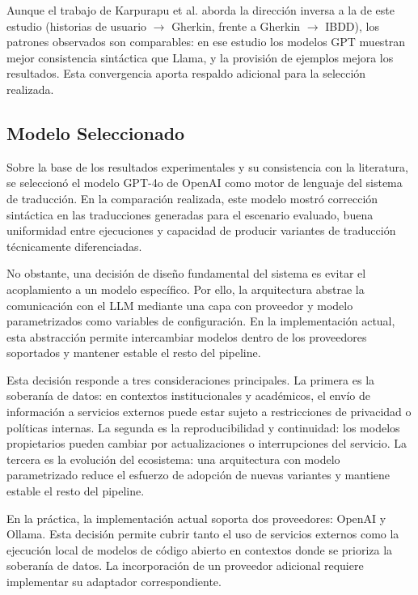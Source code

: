 Aunque el trabajo de Karpurapu et al. aborda la dirección inversa a la de este estudio (historias de usuario $\rightarrow$ Gherkin, frente a Gherkin $\rightarrow$ IBDD), los patrones observados son comparables: en ese estudio los modelos GPT muestran mejor consistencia sintáctica que Llama, y la provisión de ejemplos mejora los resultados. Esta convergencia aporta respaldo adicional para la selección realizada.

\subsection{Modelo Seleccionado}

Sobre la base de los resultados experimentales y su consistencia con la literatura, se seleccionó el modelo GPT-4o de OpenAI como motor de lenguaje del sistema de traducción. En la comparación realizada, este modelo mostró corrección sintáctica en las traducciones generadas para el escenario evaluado, buena uniformidad entre ejecuciones y capacidad de producir variantes de traducción técnicamente diferenciadas.

No obstante, una decisión de diseño fundamental del sistema es evitar el acoplamiento a un modelo específico. Por ello, la arquitectura abstrae la comunicación con el LLM mediante una capa con proveedor y modelo parametrizados como variables de configuración. En la implementación actual, esta abstracción permite intercambiar modelos dentro de los proveedores soportados y mantener estable el resto del pipeline.

Esta decisión responde a tres consideraciones principales. La primera es la soberanía de datos: en contextos institucionales y académicos, el envío de información a servicios externos puede estar sujeto a restricciones de privacidad o políticas internas. La segunda es la reproducibilidad y continuidad: los modelos propietarios pueden cambiar por actualizaciones o interrupciones del servicio. La tercera es la evolución del ecosistema: una arquitectura con modelo parametrizado reduce el esfuerzo de adopción de nuevas variantes y mantiene estable el resto del pipeline.

En la práctica, la implementación actual soporta dos proveedores: OpenAI y Ollama. Esta decisión permite cubrir tanto el uso de servicios externos como la ejecución local de modelos de código abierto en contextos donde se prioriza la soberanía de datos. La incorporación de un proveedor adicional requiere implementar su adaptador correspondiente.

